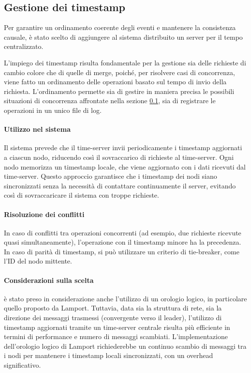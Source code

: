 \documentclass[12pt, a4paper]{report}
\begin{document}
\subsection{Gestione dei timestamp} \label{sec
}

Per garantire un ordinamento coerente degli eventi e mantenere la consistenza causale, \`e stato scelto di aggiungere al sistema distribuito un server per il tempo centralizzato.

L'impiego dei timestamp risulta fondamentale per la gestione sia delle richieste di cambio colore che di quelle di merge, poiché, per risolvere casi di concorrenza, viene fatto un ordinamento delle operazioni basato sul tempo di invio della richiesta. L'ordinamento permette sia di gestire in maniera precisa le possibili situazioni di concorrenza affrontate nella sezione \ref{sec
}, sia di registrare le operazioni in un unico file di log.

\paragraph{Utilizzo nel sistema}

Il sistema prevede che il time-server invii periodicamente i timestamp aggiornati a ciascun nodo, riducendo così il sovraccarico di richieste al time-server. Ogni nodo memorizza un timestamp locale, che viene aggiornato con i dati ricevuti dal time-server. Questo approccio garantisce che i timestamp dei nodi siano sincronizzati senza la necessit\`a di contattare continuamente il server, evitando così di sovraccaricare il sistema con troppe richieste.

\paragraph{Risoluzione dei conflitti}

In caso di conflitti tra operazioni concorrenti (ad esempio, due richieste ricevute quasi simultaneamente), l'operazione con il timestamp minore ha la precedenza. In caso di parit\`a di timestamp, si pu\`o utilizzare un criterio di tie-breaker, come l'ID del nodo mittente.

\paragraph{Considerazioni sulla scelta}

\`e stato preso in considerazione anche l'utilizzo di un orologio logico, in particolare quello proposto da Lamport. Tuttavia, data sia la struttura di rete, sia la direzione dei messaggi trasmessi (convergente verso il leader), l'utilizzo di timestamp aggiornati tramite un time-server centrale risulta pi\`u efficiente in termini di performance e numero di messaggi scambiati. L'implementazione dell'orologio logico di Lamport richiederebbe un continuo scambio di messaggi tra i nodi per mantenere i timestamp locali sincronizzati, con un overhead significativo.
\end{document}
